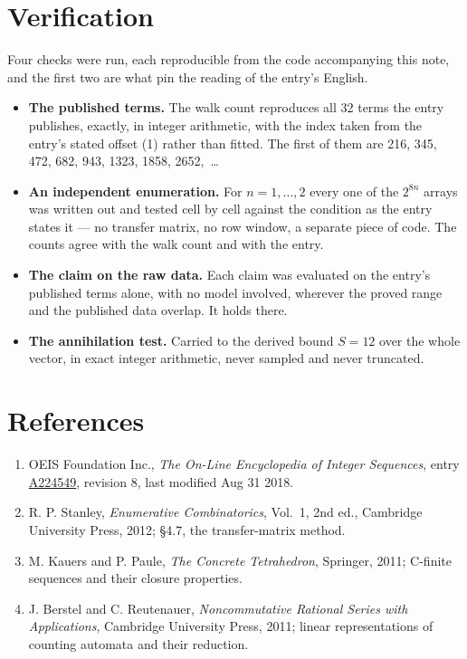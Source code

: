 \documentclass[11pt]{article}
\theoremstyle{definition}
\begin{document}
\section{Verification}

Four checks were run, each reproducible from the code accompanying this note, and the first two are what pin the reading of the entry's English.

\begin{itemize}

\item {\bfseries The published terms.} The walk count reproduces all 32 terms the entry publishes, exactly, in integer arithmetic, with the index taken from the entry's stated offset (1) rather than fitted. The first of them are 216, 345, 472, 682, 943, 1323, 1858, 2652,~\dots

\item {\bfseries An independent enumeration.} For $n = 1,\dots,2$ every one of the $2^{8n}$ arrays was written out and tested cell by cell against the condition as the entry states it --- no transfer matrix, no row window, a separate piece of code. The counts agree with the walk count and with the entry.

\item {\bfseries The claim on the raw data.} Each claim was evaluated on the entry's published terms alone, with no model involved, wherever the proved range and the published data overlap. It holds there.

\item {\bfseries The annihilation test.} Carried to the derived bound $S = 12$ over the whole vector, in exact integer arithmetic, never sampled and never truncated.

\end{itemize}

\section{References}

\begin{enumerate}

\item OEIS Foundation Inc., \emph{The On-Line Encyclopedia of Integer Sequences}, entry \href{https://oeis.org/A224549}{A224549}, revision 8, last modified Aug 31 2018.

\item R. P. Stanley, \emph{Enumerative Combinatorics}, Vol.~1, 2nd ed., Cambridge University Press, 2012; \S4.7, the transfer-matrix method.

\item M. Kauers and P. Paule, \emph{The Concrete Tetrahedron}, Springer, 2011; C-finite sequences and their closure properties.

\item J. Berstel and C. Reutenauer, \emph{Noncommutative Rational Series with Applications}, Cambridge University Press, 2011; linear representations of counting automata and their reduction.

\end{enumerate}
\end{document}
